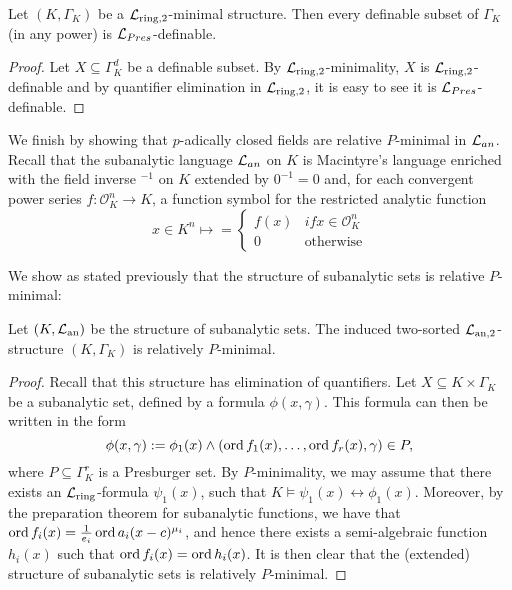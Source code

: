 \begin{cor} Let $(K,\Gamma_K)$ be a $\mathcal{L}_{\text{ring,2}}$-minimal structure. Then every definable subset of $\Gamma_K$ (in any power) is $\mathcal{L}_{Pres}$-definable.   
\end{cor}
\begin{proof}
Let $X\subseteq \Gamma_K^d$ be a definable subset. By $\mathcal{L}_{\text{ring,2}}$-minimality, $X$ is $\mathcal{L}_{\text{ring,2}}$-definable and by quantifier elimination in $\mathcal{L}_{\text{ring,2}}$, it is easy to see it is $\mathcal{L}_{Pres}$-definable.
\end{proof}



We finish by showing that $p$-adically closed fields are relative $P$-minimal in $\mathcal{L}_{an}$. Recall that the subanalytic language $\mathcal{L}_{an}$ on $K$ is Macintyre's language enriched with the field inverse $^{-1}$ on $K$ extended by $0^{-1}=0$ and, for each convergent power series $f: \mathcal{O}_K^n\to K$, a function symbol for the restricted analytic function
\begin{equation}
x\in K^n\mapsto=
\begin{cases}
f(x) & if x\in \mathcal{O}_K^n\\
0 & \text{otherwise}
\end{cases}
\label{eq:subanalytic}
\end{equation}

We show as stated previously that the structure of subanalytic sets is relative $P$-minimal:

\begin{lem}\label{lem:suban}
Let $(K, \mathcal{L}_{\text{an}})$ be the structure of subanalytic sets. The induced two-sorted $\mathcal{L}_{\text{an},2}$-structure $(K, \Gamma_K)$ is relatively $P$-minimal. 
\end{lem}
\begin{proof}
Recall that this structure has elimination of quantifiers. Let $X \subseteq K \times \Gamma_K$ be a subanalytic set, defined by a formula $\phi(x,\gamma)$. This formula can then be written in the form
\[\phi(x,\gamma):= \phi_1(x) \wedge (\operatorname{ord} f_1(x), \ldots, \operatorname{ord} f_r(x), \gamma) \in P,\]
where $P \subseteq \Gamma_K^{r}$ is a Presburger set. 
By $P$-minimality, we may assume that there exists an $\mathcal{L}_{\text{ring}}$-formula $\psi_1(x)$, such that $K \models \psi_1(x) \leftrightarrow \phi_1(x)$. Moreover, by the preparation theorem for subanalytic functions, we have that $\operatorname{ord} f_i(x) = \frac1{e_i}\operatorname{ord} a_i(x-c)^{\mu_i}$, and hence there exists a semi-algebraic function $h_i(x)$ such that $\operatorname{ord} f_i(x) = \operatorname{ord} h_i(x)$. It is then clear that the (extended) structure of subanalytic sets is relatively $P$-minimal.
\end{proof}

